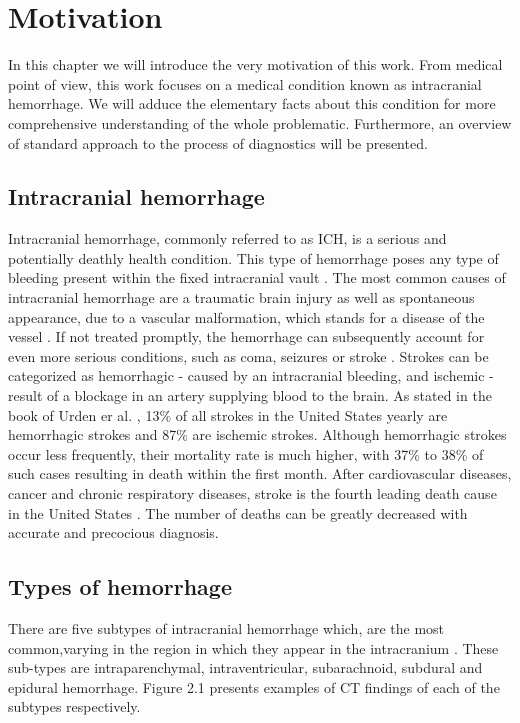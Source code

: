 \chapter{Motivation}

In this chapter we will introduce the very motivation of this work. From medical point of view, this work focuses on a medical condition known as intracranial hemorrhage. We will adduce the elementary facts about this condition for more comprehensive understanding of the whole problematic. Furthermore, an overview of standard approach to the process of diagnostics will be presented.

\section{Intracranial hemorrhage}
Intracranial hemorrhage, commonly referred to as ICH, is a serious and potentially deathly health condition. This type of hemorrhage poses any type of bleeding present within the fixed intracranial vault \cite{intracranial1}. The most common causes of intracranial hemorrhage are a traumatic brain injury as well as spontaneous appearance, due to a vascular malformation, which stands for a disease of the vessel \cite{intracranial2}. If not treated promptly, the hemorrhage can subsequently account for even more serious conditions, such as coma, seizures or stroke \cite{intracranial2}. Strokes can be categorized as hemorrhagic - caused by an intracranial bleeding, and ischemic - result of a blockage in an artery supplying blood to the brain. As stated in the book of Urden er al. \cite{ICHbookstats}, 13\% of all strokes in the United States yearly are hemorrhagic strokes and 87\% are ischemic strokes. Although hemorrhagic strokes occur less frequently, their mortality rate is much higher, with 37\% to 38\% of such cases resulting in death within the first month. After cardiovascular diseases, cancer and chronic respiratory diseases, stroke is the fourth leading death cause in the United States \cite{ICHbookstats}. The number of deaths can be greatly decreased with accurate and precocious diagnosis.

\section{Types of hemorrhage}
There are five subtypes of intracranial hemorrhage which, are the most common,varying in the region in which they appear in the intracranium \cite{ICHsubtypes-CT, imagingICH}. These sub-types are intraparenchymal, intraventricular, subarachnoid, subdural and epidural hemorrhage. Figure 2.1 presents examples of CT findings of each of the subtypes respectively.

